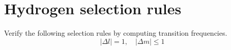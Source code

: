 

\section*{Hydrogen selection rules}

Verify the following selection rules by computing transition frequencies.
\begin{equation*}
|\Delta l|=1,\quad|\Delta m|\le1
\end{equation*}


